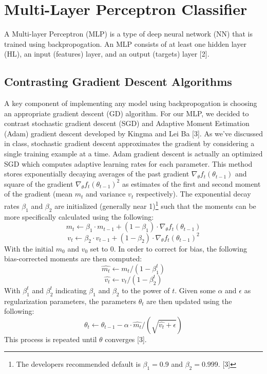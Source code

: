 \documentclass{article}
\begin{document}
\section{Multi-Layer Perceptron Classifier}
A Multi-layer Perceptron (MLP) is a type of deep neural network (NN) that is trained using backpropogation. An MLP consists of at least one hidden layer (HL), an input (features) layer, and an output (targets) layer [2].

\subsection{Contrasting Gradient Descent Algorithms}
A key component of implementing any model using backpropogation is choosing an appropriate gradient descent (GD) algorithm. For our MLP, we decided to contrast stochastic gradient descent (SGD) and Adaptive Moment Estimation (Adam) gradient descent developed by Kingma and Lei Ba [3]. As we've discussed in class, stochastic gradient descent approximates the gradient by considering a single training example at a time. Adam gradient descent is actually an optimized SGD which computes adaptive learning rates for each parameter. This method stores exponentially decaying averages of the past gradient $\nabla_\theta f_t(\theta_{t-1})$ and square of the gradient $\nabla_\theta f_t(\theta_{t-1})^2$ as estimates of the first and second moment of the gradient (mean $m_t$ and variance $v_t$ respectively). The exponential decay rates $\beta_1$ and $\beta_2$ are initialized (generally near 1)\footnote{The developers recommended default is $\beta_1 = 0.9$ and $\beta_2 = 0.999$. [3]} such that the moments can be more specifically calculated using the following:
$$m_t \leftarrow \beta_1 \cdot m_{t-1} + (1-\beta_1)\cdot \nabla_\theta f_t(\theta_{t-1}) $$
$$v_t \leftarrow \beta_2 \cdot v_{t-1} + (1-\beta_2)\cdot \nabla_\theta f_t(\theta_{t-1})^2 $$
With the initial $m_0$ and $v_0$ set to 0. In order to correct for bias, the following bias-corrected moments are then computed:
$$\hat{m_t} \leftarrow m_t/(1-\beta_1^t)$$
$$\hat{v_t} \leftarrow v_t/(1-\beta_2^t)$$
With $\beta_1^t$ and $\beta_2^t$ indicating $\beta_1$ and $\beta_2$ to the power of $t$. Given some $\alpha$ and $\epsilon$ as regularization parameters, the parameters $\theta_t$ are then updated using the following:
$$\theta_t \leftarrow \theta_{t-1} - \alpha \cdot \hat{m_t}/(\sqrt{\hat{v_t}+\epsilon})$$
This process is repeated until $\theta$ converges [3].
\end{document}
